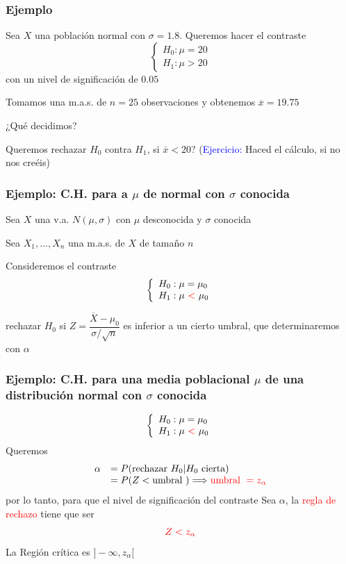 \documentclass[12pt,t]{beamer}\usepackage[]{graphicx}\usepackage[]{color}
\newcommand{\red}[1]{\textcolor{red}{#1}}
\newcommand{\blue}[1]{\textcolor{blue}{#1}}
\renewcommand{\emph}[1]{{\color{red}#1}}
\theoremstyle{plain}
\theoremstyle{definition}
\begin{document}
\begin{frame}
\frametitle{Ejemplo}
Sea $X$ una población normal con $\sigma=1.8$. Queremos hacer el contraste
$$
\left\{\begin{array}{l}
H_{0}:\mu=20\\ H_{1}:\mu>20
\end{array}
\right.
$$
con un nivel   de significación   de $0.05$
\medskip

Tomamos una m.a.s. de $n=25$ observaciones y obtenemos  $\overline{x}=19.75$
\medskip

¿Qué decidimos?
\medskip

Queremos rechazar $H_0$ contra $H_1$, si  $\overline{x}<20$? (\blue{Ejercicio:} Haced el cálculo, si no nos creéis)
\end{frame}





\begin{frame}
\frametitle{Ejemplo: C.H. para a $\mu$ de normal con $\sigma$ conocida}

Sea $X$ una v.a. $N(\mu,\sigma)$ con $\mu$ desconocida y $\sigma$ conocida
\medskip

Sea  $X_{1},\ldots,X_{n}$ una m.a.s. de $X$ de tamaño $n$
\medskip

Consideremos  el contraste
$$
\left\{\begin{array}{l}
H_{0}:\mu=\mu_{0}\\ H_{1}:\mu\ \red{<}\ \mu_{0}
\end{array}
\right.
$$
\medskip

rechazar   $H_{0}$ si $Z=\dfrac{\overline{X}-\mu_{0}}{{\sigma}/{\sqrt{n}}}$ es \emph{inferior a} un cierto umbral, que determinaremos con $\alpha$
\end{frame}

\begin{frame}
\frametitle{Ejemplo: C.H. para una media poblacional  $\mu$ de una distribución normal con $\sigma$ conocida}
\vspace*{-0.75cm}

$$
\left\{\begin{array}{l}
H_{0}:\mu=\mu_{0}\\ H_{1}:\mu\ \red{<}\ \mu_{0}
\end{array}
\right.
$$
Queremos
$$
\begin{array}{rl}
\alpha & =P(\mbox{rechazar   } H_{0}| H_{0} \mbox{ cierta})\\ 
& =P(Z<\mbox{umbral  })\Longrightarrow \red{\mbox{umbral  }=z_{\alpha}}
\end{array}
$$
por lo tanto,  para que  el nivel   de significación   del contraste    Sea $\alpha$,  la
\red{regla de rechazo} tiene que ser
$$
\red{Z<z_{\alpha}}
$$
La Región crítica es $]-\infty,z_{\alpha}[$
\end{frame}
\end{document}
